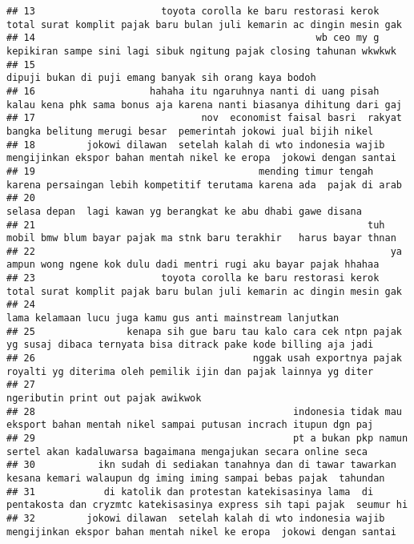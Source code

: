 \documentclass[
]{article}
\begin{document}
\begin{verbatim}
## 13                      toyota corolla ke baru restorasi kerok total surat komplit pajak baru bulan juli kemarin ac dingin mesin gak
## 14                                                 wb ceo my g kepikiran sampe sini lagi sibuk ngitung pajak closing tahunan wkwkwk 
## 15                                                                            dipuji bukan di puji emang banyak sih orang kaya bodoh
## 16                    hahaha itu ngaruhnya nanti di uang pisah kalau kena phk sama bonus aja karena nanti biasanya dihitung dari gaj
## 17                             nov  economist faisal basri  rakyat bangka belitung merugi besar  pemerintah jokowi jual bijih nikel 
## 18         jokowi dilawan  setelah kalah di wto indonesia wajib mengijinkan ekspor bahan mentah nikel ke eropa  jokowi dengan santai
## 19                                       mending timur tengah karena persaingan lebih kompetitif terutama karena ada  pajak di arab 
## 20                                                                    selasa depan  lagi kawan yg berangkat ke abu dhabi gawe disana
## 21                                                          tuh mobil bmw blum bayar pajak ma stnk baru terakhir   harus bayar thnan
## 22                                                              ya ampun wong ngene kok dulu dadi mentri rugi aku bayar pajak hhahaa
## 23                      toyota corolla ke baru restorasi kerok total surat komplit pajak baru bulan juli kemarin ac dingin mesin gak
## 24                                                                       lama kelamaan lucu juga kamu gus anti mainstream lanjutkan 
## 25                kenapa sih gue baru tau kalo cara cek ntpn pajak yg susaj dibaca ternyata bisa ditrack pake kode billing aja jadi 
## 26                                      nggak usah exportnya pajak royalti yg diterima oleh pemilik ijin dan pajak lainnya yg diter 
## 27                                                                                              ngeributin print out pajak awikwok  
## 28                                             indonesia tidak mau eksport bahan mentah nikel sampai putusan incrach itupun dgn paj 
## 29                                             pt a bukan pkp namun sertel akan kadaluwarsa bagaimana mengajukan secara online seca 
## 30           ikn sudah di sediakan tanahnya dan di tawar tawarkan kesana kemari walaupun dg iming iming sampai bebas pajak  tahundan
## 31            di katolik dan protestan katekisasinya lama  di pentakosta dan cryzmtc katekisasinya express sih tapi pajak  seumur hi
## 32         jokowi dilawan  setelah kalah di wto indonesia wajib mengijinkan ekspor bahan mentah nikel ke eropa  jokowi dengan santai

\end{verbatim}
\end{document}
